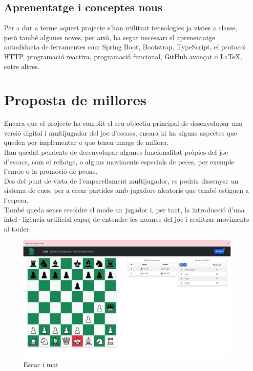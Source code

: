 \subsection{Aprenentatge i conceptes nous}
Per a dur a terme aquest projecte s'han utilitzat tecnologies ja vistes a classe, però també algunes noves, per això, ha segut necessari el aprenentatge autodidacta de ferramentes com Spring Boot, Bootstrap, TypeScript, el protocol HTTP, programació reactiva, programació funcional, GitHub avançat o \LaTeX, entre altres.
\section{Proposta de millores}
Encara que el projecte ha complit el seu objectiu principal de desenvolupar una versió digital i multijugador del joc d'escacs, encara hi ha alguns aspectes que queden per implementar o que tenen marge de millora.
\\[3mm]
Han quedat pendents de desenvolupar algunes funcionalitat pròpies del joc d'escacs, com el rellotge, o alguns moviments especials de peces, per exemple l'enroc o la promoció de peons.
\\[3mm]
Des del punt de vista de l'emparellament multijugador, es podria dissenyar un sistema de cues, per a crear partides amb jugadors aleatoris que també estiguen a l'espera.
\\[3mm]
També queda sense resoldre el mode un jugador i, per tant, la introducció d'una intel·ligència artificial capaç de entendre les normes del joc i realitzar moviments al tauler.
\begin{figure}[H]
    \centering
    \includegraphics[width=\textwidth]{images/escac-mat.png}
    \caption{Escac i mat}
    \label{fig:Escac i mat}
\end{figure}